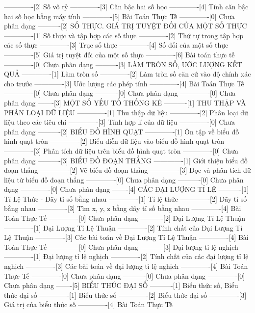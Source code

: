 -------------[2] Số vô tỷ
-------------[3] Căn bậc hai số học
-------------[4] Tính căn bậc hai số học bằng máy tính
-------------[5] Bài Toán Thực Tế
-------------[0] Chưa phân dạng
----------[2] SỐ THỰC. GIÁ TRỊ TUYỆT ĐỐI CỦA MỘT SỐ THỰC
-------------[1] Số thực và tập hợp các số thực
-------------[2] Thứ tự trong tập hợp các số thực
-------------[3] Trục số thực
-------------[4] Số đối của một số thực
-------------[5] Giá trị tuyệt đối của một số thực
-------------[6] Bài toán thực tế
-------------[0] Chưa phân dạng
----------[3] LÀM TRÒN SỐ, ƯỚC LƯỢNG KẾT QUẢ
-------------[1] Làm tròn số
-------------[2] Làm tròn số căn cứ vào độ chính xác cho trước
-------------[3] Ước lượng các phép tính
-------------[4] Bài Toán Thực Tế
-------------[0] Chưa phân dạng
----------[0] Chưa phân dạng
-------------[0] Chưa phân dạng
-------[3] MỘT SỐ YẾU TỐ THỐNG KÊ
----------[1] THU THẬP VÀ PHÂN LOẠI DỮ LIỆU
-------------[1] Thu thập dữ liệu
-------------[2] Phân loại dữ liệu theo các tiêu chí
-------------[3] Tính hợp lí của dữ liệu
-------------[0] Chưa phân dạng
----------[2] BIỂU ĐỒ HÌNH QUẠT
-------------[1] Ôn tập về biểu đồ hình quạt tròn
-------------[2] Biểu diễn dữ liệu vào biểu đồ hình quạt tròn
-------------[3] Phân tích dữ liệu trên biểu đồ hình quạt tròn
-------------[0] Chưa phân dạng
----------[3] BIỂU ĐỒ ĐOẠN THẲNG
-------------[1] Giới thiệu biểu đồ đoạn thẳng
-------------[2] Vẽ biểu đồ đoạn thẳng
-------------[3] Đọc và phân tích dữ liệu từ biểu đồ đoạn thẳng
-------------[0] Chưa phân dạng
----------[0] Chưa phân dạng
-------------[0] Chưa phân dạng
-------[4] CÁC ĐẠI LƯỢNG TỈ LỆ
----------[1] Tỉ Lệ Thức - Dãy tỉ số bằng nhau
-------------[1] Tỉ lệ thức
-------------[2] Dãy tỉ số bằng nhau
-------------[3] Tìm x, y, z bằng dãy tỉ số bằng nhau
-------------[4] Bài Toán Thực Tế
-------------[0] Chưa phân dạng
----------[2] Đại Lượng Tỉ Lệ Thuận
-------------[1] Đại Lượng Tỉ Lệ Thuận
-------------[2] Tính chất của Đại Lượng Tỉ Lệ Thuận
-------------[3] Các bài toán về Đại Lượng Tỉ Lệ Thuận
-------------[4] Bài Toán Thực Tế
-------------[0] Chưa phân dạng
----------[3] Đại lượng tỉ lệ nghịch
-------------[1] Đại lượng tỉ lệ nghịch
-------------[2] Tính chất của các đại lượng tỉ lệ nghịch
-------------[3] Các bài toán về đại lượng tỉ lệ nghịch
-------------[4] Bài Toán Thực Tế
-------------[0] Chưa phân dạng
----------[0] Chưa phân dạng
-------------[0] Chưa phân dạng
-------[5] BIỂU THỨC ĐẠI SỐ
----------[1] Biểu thức số, Biểu thức đại số
-------------[1] Biểu thức số
-------------[2] Biểu thức đại số
-------------[3] Giá trị của biểu thức số
-------------[4] Bài Toán Thực Tế

